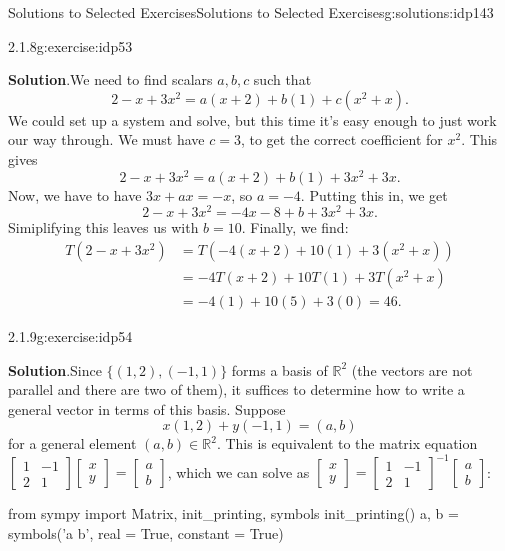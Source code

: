 \documentclass[oneside,10pt,]{book}
\newcommand{\blocktitlefont}{\relax}
\numberwithin{equation}{section}
\newcommand{\bbm}{\begin{bmatrix}}
\newcommand{\ebm}{\end{bmatrix}}
\newcommand{\R}{\mathbb{R}}
\newcommand{\amp}{&}
\begin{document}
\begin{solutions-chapter}{Solutions to Selected Exercises}{}{Solutions to Selected Exercises}{}{}{g:solutions:idp143}
\begin{inlinesolution}{2.1.8}{}{g:exercise:idp53}%
\par\smallskip%
\noindent\textbf{\blocktitlefont Solution}.\hypertarget{g:solution:idp158-back}{}\quad{}We need to find scalars \(a,b,c\) such that%
\begin{equation*}
2-x+3x^2 = a(x+2)+b(1)+c(x^2+x)\text{.}
\end{equation*}
We could set up a system and solve, but this time it's easy enough to just work our way through. We must have \(c=3\), to get the correct coefficient for \(x^2\). This gives%
\begin{equation*}
2-x+3x^2=a(x+2)+b(1)+3x^2+3x\text{.}
\end{equation*}
Now, we have to have \(3x+ax=-x\), so \(a=-4\). Putting this in, we get%
\begin{equation*}
2-x+3x^2=-4x-8+b+3x^2+3x\text{.}
\end{equation*}
Simiplifying this leaves us with \(b=10\). Finally, we find:%
\begin{align*}
T(2-x+3x^2) \amp = T(-4(x+2)+10(1)+3(x^2+x)) \\
\amp = -4T(x+2)+10T(1)+3T(x^2+x)\\
\amp = -4(1)+10(5)+3(0) = 46\text{.}
\end{align*}
%
\end{inlinesolution}%
\begin{inlinesolution}{2.1.9}{}{g:exercise:idp54}%
\par\smallskip%
\noindent\textbf{\blocktitlefont Solution}.\hypertarget{g:solution:idp159-back}{}\quad{}Since \(\{(1,2),(-1,1)\}\) forms a basis of \(\R^2\) (the vectors are not parallel and there are two of them), it suffices to determine how to write a general vector in terms of this basis. Suppose%
\begin{equation*}
x(1,2)+y(-1,1)=(a,b)
\end{equation*}
for a general element \((a,b)\in \R^2\). This is equivalent to the matrix equation \(\bbm 1\amp -1\\2\amp 1\ebm\bbm x\\y\ebm = \bbm a\\b\ebm\), which we can solve as \(\bbm x\\y\ebm = \bbm 1\amp -1\\2\amp 1\ebm^{-1}\bbm a\\b\ebm\):%
\begin{sageinput}
from sympy import Matrix, init_printing, symbols
init_printing()
a, b = symbols('a b', real = True, constant = True)

\end{sageinput}
\end{inlinesolution}
\end{solutions-chapter}
\end{document}
